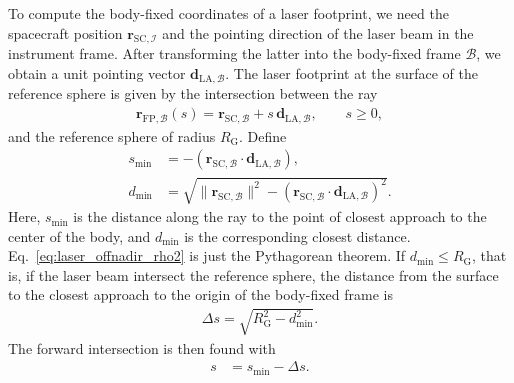 \documentclass[lineno, pdflatex,sn-mathphys-ay]{sn-jnl}
\theoremstyle{thmstyleone}%
\theoremstyle{thmstyletwo}%
\theoremstyle{thmstylethree}%
\renewcommand{\vec}[1]{\boldsymbol{#1}}
\begin{document}
To compute the body-fixed coordinates of a laser footprint, we need the spacecraft position $\vec{r}_{\mathrm{SC},\mathcal{I}}$ and the pointing direction of the laser beam in the instrument frame. After transforming the latter into the body-fixed frame $\mathcal{B}$, we obtain a unit pointing vector $\vec{d}_{\mathrm{LA},\mathcal{B}}$. The laser footprint at the surface of the reference sphere is given by the intersection between the ray
\begin{align}\label{eq:def_rLA_offnadir}
    \vec{r}_{\mathrm{FP},\mathcal{B}}(s) = \vec{r}_{\mathrm{SC},\mathcal{B}} + s\,\vec{d}_{\mathrm{LA},\mathcal{B}}, \qquad s \ge 0,
\end{align}
and the reference sphere of radius $R_{\mathrm{G}}$. 
%
Define
%
\begin{subequations}
\begin{align}
    s_{\mathrm{min}} &= - \left(\vec{r}_{\mathrm{SC},\mathcal{B}} \cdot \vec{d}_{\mathrm{LA},\mathcal{B}}\right), \\
    d_{\mathrm{min}} &=
	\sqrt{
	\|\vec{r}_{\mathrm{SC},\mathcal{B}}\|^{2}
	- \left(\vec{r}_{\mathrm{SC},\mathcal{B}} \cdot \vec{d}_{\mathrm{LA},\mathcal{B}}\right)^{2}
	}.
	\label{eq:laser_offnadir_rho2}
\end{align}
\end{subequations}
%
Here, $s_{\mathrm{min}}$ is the distance along the ray to the point of closest approach to the center of the body, and $d_{\mathrm{min}}$ is the corresponding closest distance. Eq.~\eqref{eq:laser_offnadir_rho2} is just the Pythagorean theorem.
If ${d_{\mathrm{min}} \le R_{\mathrm{G}}}$, that is, if the laser beam intersect the reference sphere, the distance from the surface to the closest approach to the origin of the body-fixed frame is
\begin{align}
    \Delta s = \sqrt{R_{\mathrm{G}}^{2} - d_{\mathrm{min}}^{2}}.
\end{align}
The forward intersection is then found with
\begin{align}\label{eq:def_c_min_delta}
    s &= s_{\mathrm{min}} - \Delta s. 
\end{align}
\end{document}
